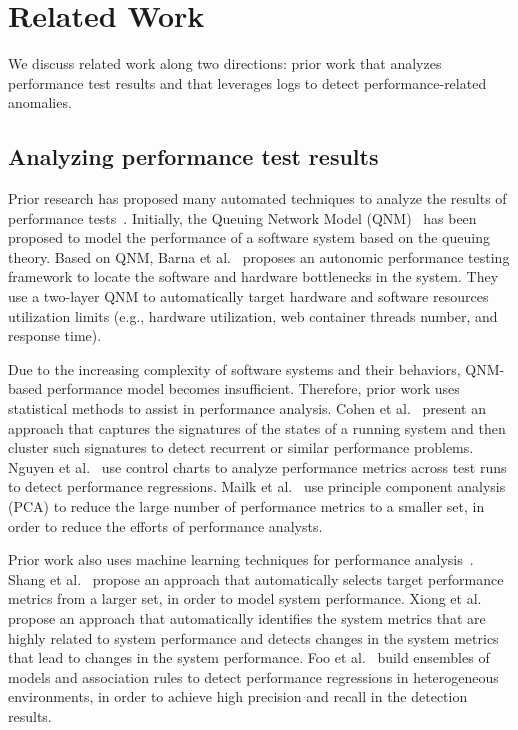 \section{Related Work} \label{sec:relatedwork}
We discuss related work along two directions: prior work that analyzes performance test results and that leverages logs to detect performance-related anomalies.

\subsection{Analyzing performance test results}
Prior research has proposed many automated techniques to analyze the results of performance tests~\citep{DBLP:conf/icst/GaoJBL16,DBLP:journals/tse/JiangH15}.
Initially, the Queuing Network Model (QNM)~\citep{DBLP:books/daglib/0076254} has been proposed to model the performance of a software system based on the queuing theory. 
Based on QNM, Barna et al.~\citep{DBLP:conf/icac/BarnaLG11} proposes an autonomic performance testing framework to locate the software and hardware bottlenecks in the system. They use a two-layer QNM to automatically target hardware and software resources utilization limits (e.g., hardware utilization, web container threads number, and response time). 

Due to the increasing complexity of software systems and their behaviors, QNM-based performance model becomes insufficient.
Therefore, prior work uses statistical methods to assist in performance analysis.
Cohen et al.~\citep{DBLP:conf/sosp/CohenZGSKF05} present an approach that captures the signatures of the states of a running system and then cluster such signatures to detect recurrent or similar performance problems. 
Nguyen et al.~\citep{DBLP:conf/apsec/NguyenAJHNF11,DBLP:conf/wosp/NguyenAJHNF12} use control charts to analyze performance metrics across test runs to detect performance regressions.
Mailk et al.~\citep{DBLP:conf/csmr/MalikJAHFH10,DBLP:conf/icse/MalikHH13} use principle component analysis (PCA) to reduce the large number of performance metrics to a smaller set, in order to reduce the efforts of performance analysts.

Prior work also uses machine learning techniques for performance analysis~\citep{DBLP:conf/wosp/ShangHNF15,DBLP:conf/wosp/XiongPZG13,Foo:2015:ICS:2819009.2819034,DBLP:conf/icdm/LimLZFTLDZ14,DBLP:conf/wosp/DidonaQRT15}.
Shang et al.~\citep{DBLP:conf/wosp/ShangHNF15} propose an approach that automatically selects target performance metrics from a larger set, in order to model system performance. 
Xiong et al.~\citep{DBLP:conf/wosp/XiongPZG13} propose an approach that automatically identifies the system metrics that are highly related to system performance and detects changes in the system metrics that lead to changes in the system performance. 
Foo et al.~\citep{Foo:2015:ICS:2819009.2819034} build ensembles of models and association rules to detect performance regressions in heterogeneous environments, in order to achieve high precision and recall in the detection results.

